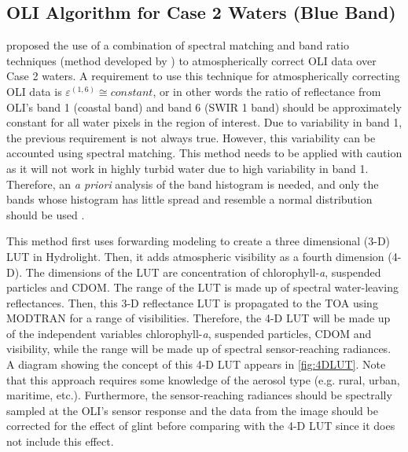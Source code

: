 \subsection{OLI Algorithm for Case 2 Waters (Blue Band)}
\label{subsec:blueband}
\citet{GeraceThesis} proposed the use of a combination of spectral matching and band ratio techniques (method developed by \citet{Gordon:1994}) to atmospherically correct OLI data over Case 2 waters. A requirement to use this technique for atmospherically correcting OLI data is $\varepsilon^{(1,6)}\cong constant$, or in other words the ratio of reflectance from OLI's band 1 (coastal band) and band 6 (SWIR 1 band) should be approximately constant for all water pixels in the region of interest. Due to variability in band 1, the previous requirement is not always true. However, this variability can be accounted using spectral matching. This method needs to be applied with caution as it will not work in highly turbid water due to high variability in band 1. Therefore, an {\it a priori} analysis of the band histogram is needed, and only the bands whose histogram has little spread and resemble a normal distribution should be used \citep{GeraceThesis}.

This method first uses forwarding modeling to create a three dimensional (3-D) LUT in Hydrolight. Then, it adds atmospheric visibility as a fourth dimension (4-D). The dimensions of the LUT are concentration of chlorophyll-{\it a}, suspended particles and CDOM. The range of the LUT is made up of spectral water-leaving reflectances. Then, this 3-D reflectance LUT is propagated to the TOA using MODTRAN for a range of visibilities. Therefore, the 4-D LUT will be made up of the independent variables chlorophyll-{\it a}, suspended particles, CDOM and visibility, while the range will be made up of spectral sensor-reaching radiances. A diagram showing the concept of this 4-D LUT appears in \autoref{fig:4DLUT}. Note that this approach requires some knowledge of the aerosol type (e.g. rural, urban, maritime, etc.). Furthermore, the sensor-reaching radiances should be spectrally sampled at the OLI's sensor response and the data from the image should be corrected for the effect of glint before comparing with the 4-D LUT since it does not include this effect.

